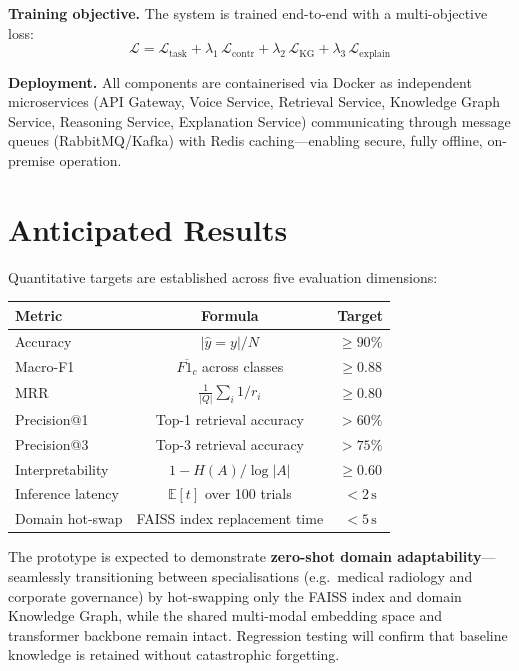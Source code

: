 \documentclass[12pt,a4paper]{article}
\begin{document}
\textbf{Training objective.}
The system is trained end-to-end with a multi-objective loss:
\[
  \mathcal{L}
  = \mathcal{L}_{\mathrm{task}}
  + \lambda_1\,\mathcal{L}_{\mathrm{contr}}
  + \lambda_2\,\mathcal{L}_{\mathrm{KG}}
  + \lambda_3\,\mathcal{L}_{\mathrm{explain}}
\]

\textbf{Deployment.}
All components are containerised via Docker as independent microservices
(API Gateway, Voice Service, Retrieval Service, Knowledge Graph Service, Reasoning Service,
Explanation Service) communicating through message queues (RabbitMQ/Kafka) with Redis
caching---enabling secure, fully offline, on-premise operation.

\section*{Anticipated Results}

Quantitative targets are established across five evaluation dimensions:

\begin{center}
\begin{tabular}{lcc}
\toprule
\textbf{Metric} & \textbf{Formula} & \textbf{Target} \\
\midrule
Accuracy          & $|\hat{y}=y|/N$                       & $\geq 90\%$    \\
Macro-F1          & $\overline{F1_c}$ across classes       & $\geq 0.88$    \\
MRR               & $\frac{1}{|Q|}\sum_i 1/r_i$           & $\geq 0.80$    \\
Precision@1       & Top-1 retrieval accuracy              & $> 60\%$       \\
Precision@3       & Top-3 retrieval accuracy              & $> 75\%$       \\
Interpretability  & $1 - H(A)/\log|A|$                    & $\geq 0.60$    \\
Inference latency & $\mathbb{E}[t]$ over 100 trials       & $< 2\,\mathrm{s}$ \\
Domain hot-swap   & FAISS index replacement time          & $< 5\,\mathrm{s}$ \\
\bottomrule
\end{tabular}
\end{center}

The prototype is expected to demonstrate \textbf{zero-shot domain adaptability}---
seamlessly transitioning between specialisations (e.g.\ medical radiology and corporate
governance) by hot-swapping only the FAISS index and domain Knowledge Graph, while
the shared multi-modal embedding space and transformer backbone remain intact.
Regression testing will confirm that baseline knowledge is retained without
catastrophic forgetting.
\end{document}
